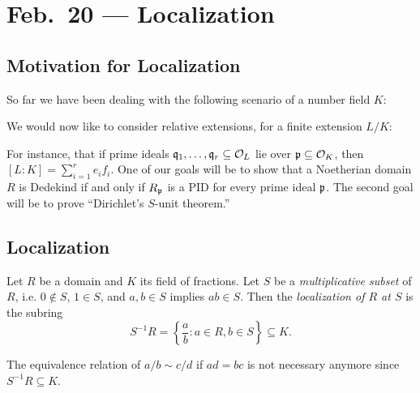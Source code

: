 \chapter{Feb.~20 --- Localization}

\section{Motivation for Localization}

\begin{remark}
So far we have been dealing with the following
scenario of a number field $K$:
\begin{center}
\end{center}
We would now like to consider relative extensions,
for a finite extension $L / K$:
\begin{center}
\end{center}
For instance, that if prime ideals $\mathfrak{q}_1, \dots, \mathfrak{q}_r \subseteq \mathcal{O}_L$ lie
over $\mathfrak{p} \subseteq \mathcal{O}_K$, then $[L : K] = \sum_{i = 1}^r e_i f_i$.
One of our goals will be to show that a Noetherian
domain $R$ is Dedekind if and only if $R_{\mathfrak{p}}$ is a
PID for every prime ideal $\mathfrak{p}$.
The second goal will be to prove
``Dirichlet's $S$-unit theorem.''
\end{remark}

\section{Localization}

\begin{definition}
  Let $R$ be a domain and $K$ its field of fractions.
  Let $S$ be a \emph{multiplicative subset} of $R$,
  i.e. $0 \notin S$, $1 \in S$, and
  $a, b \in S$ implies $ab \in S$. Then the
  \emph{localization of $R$ at $S$} is the subring
  \[
    S^{-1} R = \left\{ \frac{a}{b} : a \in R, b \in S \right\} \subseteq K.
  \]
\end{definition}

\begin{remark}
  The equivalence relation of $a / b \sim c / d$
  if $ad = bc$ is not necessary anymore since
  $S^{-1} R \subseteq K$.
\end{remark}

